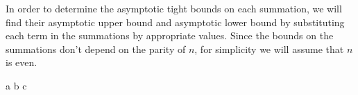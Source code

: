 In order to determine the asymptotic tight bounds on each summation, we will find their asymptotic upper bound and asymptotic lower bound by substituting each term in the summations by appropriate values.
Since the bounds on the summations don't depend on the parity of $n$, for simplicity we will assume that $n$ is even.

{a}
{b}
{c}
